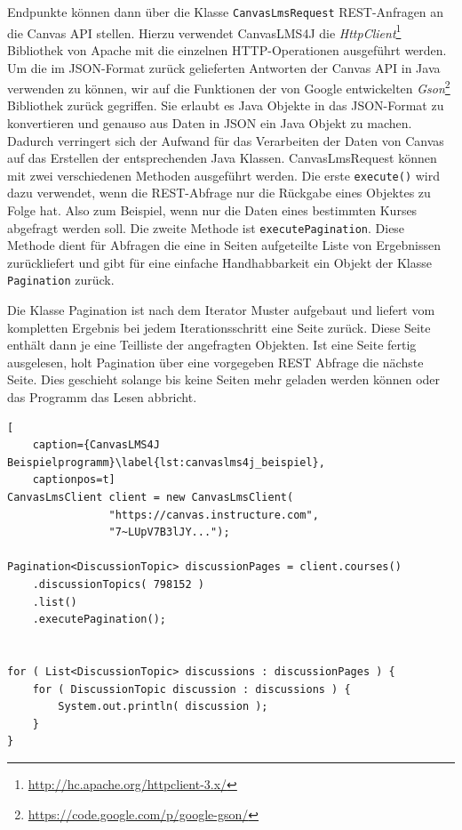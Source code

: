 Endpunkte können dann über die Klasse \texttt{CanvasLmsRequest} REST-Anfragen an die Canvas API stellen. Hierzu verwendet CanvasLMS4J die \emph{HttpClient}\footnote{\url{http://hc.apache.org/httpclient-3.x/}} Bibliothek von Apache mit die einzelnen HTTP-Operationen ausgeführt werden. Um die im JSON-Format zurück gelieferten Antworten der Canvas API in Java verwenden zu können, wir auf die Funktionen der von Google entwickelten \emph{Gson}\footnote{\url{https://code.google.com/p/google-gson/}} Bibliothek zurück gegriffen. Sie erlaubt es Java Objekte in das JSON-Format zu konvertieren und genauso aus Daten in JSON ein Java Objekt zu machen. Dadurch verringert sich der Aufwand für das Verarbeiten der Daten von Canvas auf das Erstellen der entsprechenden Java Klassen. CanvasLmsRequest können mit zwei verschiedenen Methoden ausgeführt werden. Die erste \texttt{execute()} wird dazu verwendet, wenn die REST-Abfrage nur die Rückgabe eines Objektes zu Folge hat. Also zum Beispiel, wenn nur die Daten eines bestimmten Kurses abgefragt werden soll. Die zweite Methode ist \texttt{executePagination}. Diese Methode dient für Abfragen die eine in Seiten aufgeteilte Liste von Ergebnissen zurückliefert und gibt für eine einfache Handhabbarkeit ein Objekt der Klasse \texttt{Pagination} zurück. 

Die Klasse Pagination ist nach dem Iterator Muster aufgebaut und liefert vom kompletten Ergebnis bei jedem Iterationsschritt eine Seite zurück. Diese Seite enthält dann je eine Teilliste der angefragten Objekten. Ist eine Seite fertig ausgelesen, holt Pagination über eine vorgegeben REST Abfrage die nächste Seite. Dies geschieht solange bis keine Seiten mehr geladen werden können oder das Programm das Lesen abbricht.

\begin{lstlisting}[
    caption={CanvasLMS4J Beispielprogramm}\label{lst:canvaslms4j_beispiel},
    captionpos=t]
CanvasLmsClient client = new CanvasLmsClient(
                "https://canvas.instructure.com",
                "7~LUpV7B3lJY...");

Pagination<DiscussionTopic> discussionPages = client.courses()
    .discussionTopics( 798152 )
    .list()
    .executePagination();


for ( List<DiscussionTopic> discussions : discussionPages ) {
    for ( DiscussionTopic discussion : discussions ) {
        System.out.println( discussion );
    }
}

\end{lstlisting}

